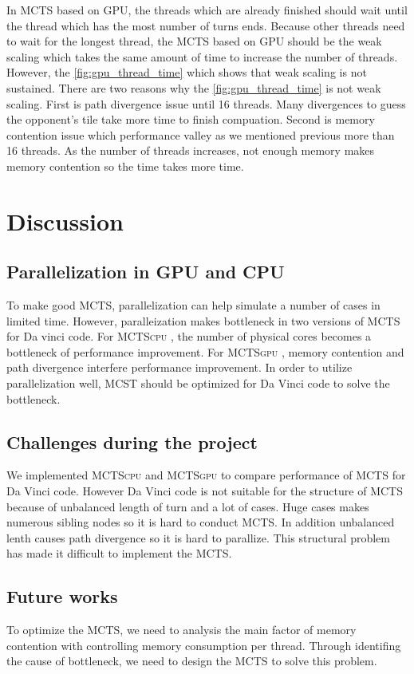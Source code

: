 \documentclass[conference]{IEEEtran}
\newcommand{\cpu} {\textsc{MCTScpu} }
\newcommand{\gpu} {\textsc{MCTSgpu} }
\begin{document}
In MCTS based on GPU, the threads which are already finished should wait until the thread which has the most number of turns ends. 
Because other threads need to wait for the longest thread, the MCTS based on GPU should be the weak scaling which takes the same amount of time to increase the number of threads.
However, the \cref{fig:gpu_thread_time} which shows that weak scaling is not sustained. 
There are two reasons why the \cref{fig:gpu_thread_time} is not weak scaling. 
First is path divergence issue until 16 threads. 
Many divergences to guess the opponent's tile take more time to finish compuation.   
Second is memory contention issue which performance valley as we mentioned previous more than 16 threads.
As the number of threads increases, not enough memory makes memory contention so the time takes more time.


\section{Discussion}
\subsection{Parallelization in GPU and CPU}
To make good MCTS, parallelization can help simulate a number of cases in limited time. 
However, paralleization makes bottleneck in two versions of MCTS for Da vinci code.
For \cpu, the number of physical cores becomes a bottleneck of performance improvement.
For \gpu, memory contention and path divergence interfere performance improvement. 
In order to utilize parallelization well, MCST should be optimized for Da Vinci code to solve the bottleneck.

\subsection{Challenges during the project} %
We implemented \cpu and \gpu to compare performance of MCTS for Da Vinci code. 
However Da Vinci code is not suitable for the structure of MCTS because of unbalanced length of turn and a lot of cases.
Huge cases makes numerous sibling nodes so it is hard to conduct MCTS. 
In addition unbalanced lenth causes path divergence so it is hard to parallize.
This structural problem has made it difficult to implement the MCTS.

\subsection{Future works}
To optimize the MCTS, we need to analysis the main factor of memory contention with controlling memory consumption per thread. 
Through identifing the cause of bottleneck, we need to design the MCTS to solve this problem.
\end{document}
